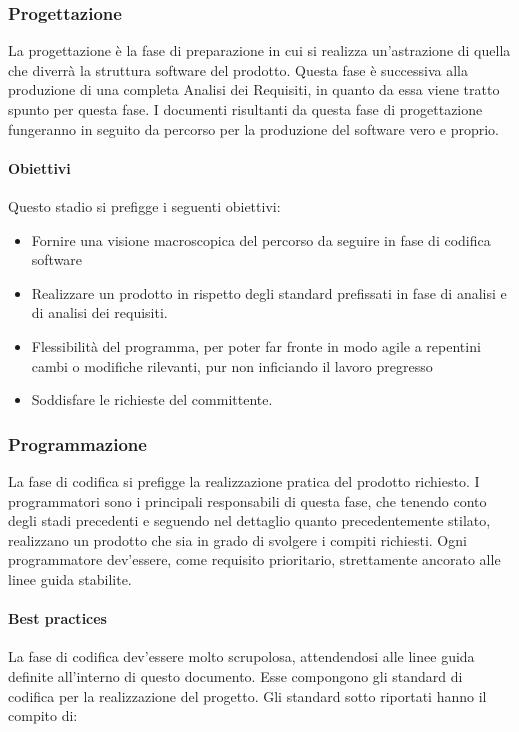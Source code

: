\subsubsection{Progettazione}

La progettazione è la fase di preparazione in cui si realizza un'astrazione di quella che diverrà la struttura software del prodotto. Questa fase è successiva alla produzione di una completa Analisi dei Requisiti, in quanto da essa viene tratto spunto per questa fase. I documenti risultanti da questa fase di progettazione fungeranno in seguito da percorso per la produzione del software vero e proprio.

\paragraph{Obiettivi}
Questo stadio si prefigge i seguenti obiettivi:
\begin{itemize}
	\item Fornire una visione macroscopica del percorso da seguire in fase di codifica software
	\item Realizzare un prodotto in rispetto degli standard prefissati in fase di analisi e di analisi dei requisiti.
	\item Flessibilità del programma, per poter far fronte in modo agile a repentini cambi o modifiche rilevanti, pur non inficiando il lavoro pregresso
	\item Soddisfare le richieste del committente.
\end{itemize}

\subsubsection{Programmazione}

La fase di codifica si prefigge la realizzazione pratica del prodotto richiesto. I programmatori sono i principali responsabili di questa fase, che tenendo conto degli stadi precedenti e seguendo nel dettaglio quanto precedentemente stilato, realizzano un prodotto che sia in grado di svolgere i compiti richiesti. Ogni programmatore dev'essere, come requisito prioritario, strettamente ancorato alle linee guida stabilite.



\paragraph{Best practices}

La fase di codifica dev'essere molto scrupolosa, attendendosi alle linee guida definite all'interno di questo documento. Esse compongono gli standard di codifica per la realizzazione del progetto. Gli standard sotto riportati hanno il compito di:

